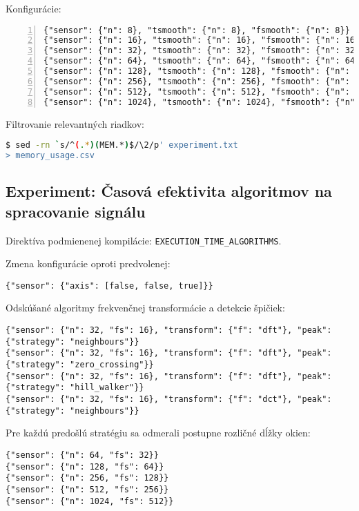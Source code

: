 Konfigurácie:
\begin{lstlisting}[style=messages, numbers=left, numberstyle=\tiny]
{"sensor": {"n": 8}, "tsmooth": {"n": 8}, "fsmooth": {"n": 8}}
{"sensor": {"n": 16}, "tsmooth": {"n": 16}, "fsmooth": {"n": 16}}
{"sensor": {"n": 32}, "tsmooth": {"n": 32}, "fsmooth": {"n": 32}}
{"sensor": {"n": 64}, "tsmooth": {"n": 64}, "fsmooth": {"n": 64}}
{"sensor": {"n": 128}, "tsmooth": {"n": 128}, "fsmooth": {"n": 128}}
{"sensor": {"n": 256}, "tsmooth": {"n": 256}, "fsmooth": {"n": 256}}
{"sensor": {"n": 512}, "tsmooth": {"n": 512}, "fsmooth": {"n": 512}}
{"sensor": {"n": 1024}, "tsmooth": {"n": 1024}, "fsmooth": {"n": 1024}}
\end{lstlisting}

Filtrovanie relevantných riadkov:
\begin{lstlisting}[style=messages, language=sh]
$ sed -rn `s/^(.*)(MEM.*)$/\2/p' experiment.txt 
> memory_usage.csv
\end{lstlisting}

\subsection*{Experiment: Časová efektivita algoritmov na spracovanie signálu}
Direktíva podmienenej kompilácie: \verb|EXECUTION_TIME_ALGORITHMS|.

\noindent Zmena konfigurácie oproti predvolenej:
\begin{lstlisting}[style=experiments]
{"sensor": {"axis": [false, false, true]}}
\end{lstlisting}

\noindent Odskúšané algoritmy frekvenčnej transformácie a detekcie špičiek:
\begin{lstlisting}[style=experiments]
{"sensor": {"n": 32, "fs": 16}, "transform": {"f": "dft"}, "peak": {"strategy": "neighbours"}}
{"sensor": {"n": 32, "fs": 16}, "transform": {"f": "dft"}, "peak": {"strategy": "zero_crossing"}}
{"sensor": {"n": 32, "fs": 16}, "transform": {"f": "dft"}, "peak": {"strategy": "hill_walker"}}
{"sensor": {"n": 32, "fs": 16}, "transform": {"f": "dct"}, "peak": {"strategy": "neighbours"}}
\end{lstlisting}

\noindent Pre každú predošlú stratégiu sa odmerali postupne rozličné dĺžky okien:
\begin{lstlisting}[style=experiments]
{"sensor": {"n": 64, "fs": 32}}
{"sensor": {"n": 128, "fs": 64}}
{"sensor": {"n": 256, "fs": 128}}
{"sensor": {"n": 512, "fs": 256}}
{"sensor": {"n": 1024, "fs": 512}}
\end{lstlisting}


